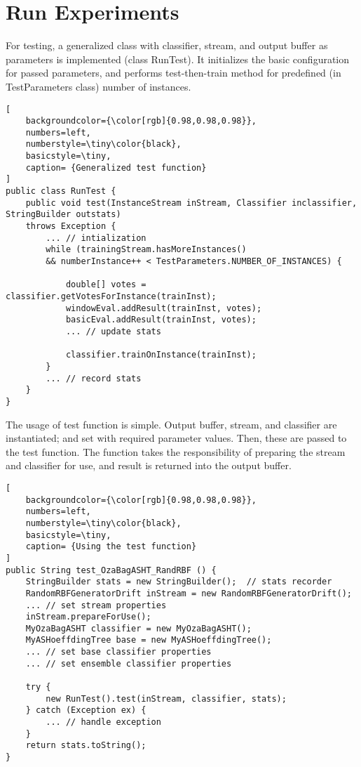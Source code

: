 \section*{Run Experiments}
For testing, a generalized class with classifier, stream, and output buffer as parameters is implemented (class RunTest). It initializes the basic configuration for passed parameters, and performs test-then-train method for predefined (in TestParameters class) number of instances.
\begin{lstlisting}[
    backgroundcolor={\color[rgb]{0.98,0.98,0.98}},
    numbers=left,
    numberstyle=\tiny\color{black},
    basicstyle=\tiny,
    caption= {Generalized test function}
]
public class RunTest {
    public void test(InstanceStream inStream, Classifier inclassifier, StringBuilder outstats) 
    throws Exception {
        ... // intialization
        while (trainingStream.hasMoreInstances()
        && numberInstance++ < TestParameters.NUMBER_OF_INSTANCES) {
            
            double[] votes = classifier.getVotesForInstance(trainInst);
            windowEval.addResult(trainInst, votes);
            basicEval.addResult(trainInst, votes);
            ... // update stats
            
            classifier.trainOnInstance(trainInst);
        }
        ... // record stats
    }
}
\end{lstlisting}
The usage of test function is simple. Output buffer, stream, and classifier are instantiated; and set with required parameter values. Then, these are passed to the test function. The function takes the responsibility of preparing the stream and classifier for use, and result is returned into the output buffer. %
\begin{lstlisting}[
    backgroundcolor={\color[rgb]{0.98,0.98,0.98}},
    numbers=left,
    numberstyle=\tiny\color{black},
    basicstyle=\tiny,
    caption= {Using the test function}
]
public String test_OzaBagASHT_RandRBF () {	
    StringBuilder stats = new StringBuilder();	// stats recorder	
    RandomRBFGeneratorDrift inStream = new RandomRBFGeneratorDrift();
    ...	// set stream properties
    inStream.prepareForUse();	
    MyOzaBagASHT classifier = new MyOzaBagASHT();
    MyASHoeffdingTree base = new MyASHoeffdingTree();
    ...	// set base classifier properties
    ...	// set ensemble classifier properties
    
    try {
        new RunTest().test(inStream, classifier, stats);
    } catch (Exception ex) {
        ...	// handle exception
    }
    return stats.toString();
}
\end{lstlisting}
